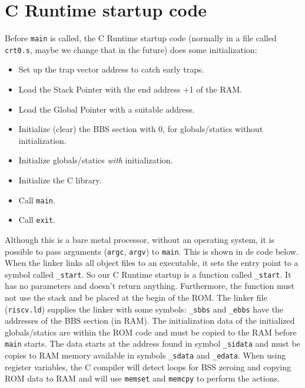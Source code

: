 \documentclass[12pt]{article}
\begin{document}
\appendix
\section{C Runtime startup code}
Before \lstinline|main| is called, the C Runtime startup code (normally in a file called \lstinline|crt0.s|, maybe we change that in the future) does some initialization:

\begin{itemize}
\item Set up the trap vector address to catch early traps.
\item Load the Stack Pointer with the end address +1 of the RAM.
\item Load the Global Pointer with a suitable address.
\item Initialize (clear) the BBS section with 0, for globals/statics without initialization.
\item Initialize globals/statics \emph{with} initialization.
\item Initialize the C library.
\item Call \lstinline|main|.
\item Call \lstinline|exit|.
\end{itemize} 

Although this is a bare metal processor, without an operating system, it is possible to pass arguments (\lstinline|argc|, \lstinline|argv|) to \lstinline|main|. This is shown in de code below. When the linker links all object files to an executable, it sets the entry point to a symbol called \lstinline|_start|. So our C Runtime startup is a function called \lstinline|_start|. It has no parameters and doesn't return anything. Furthermore, the function must not use the stack and be placed at the begin of the ROM. The linker file (\lstinline|riscv.ld|) supplies the linker with some symbols: \lstinline|_sbbs| and \lstinline|_ebbs| have the addresses of the BBS section (in RAM). The initialization data of the initialized globals/statics are within the ROM code and must be copied to the RAM before \lstinline|main| starts. The data starts at the address found in symbol \lstinline|_sidata| and must be copies to RAM memory available in symbols \lstinline|_sdata| and \lstinline|_edata|.
When using register variables, the C compiler will detect loops for BSS zeroing and copying ROM data to RAM and will use \lstinline|memset| and \lstinline|memcpy| to perform the actions.


\end{document}
